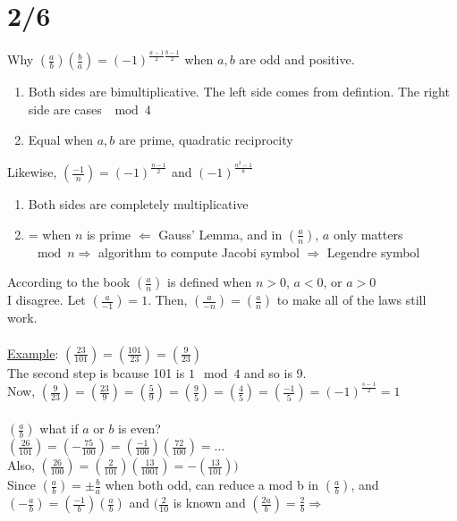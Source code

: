 \section*{2/6}
  Why $(\frac{a}{b})(\frac{b}{a}) = (-1)^{\frac{a-1}{2}\frac{b-1}{2}}$
  when $a,b$ are odd and positive.\\
  \begin{enumerate}
    \item Both sides are bimultiplicative. The left side comes from defintion.
      The right side are cases $\mod 4$
    \item Equal when $a,b$ are prime, quadratic reciprocity
  \end{enumerate}
  Likewise, $(\frac{-1}{n}) = (-1)^{\frac{n-1}{2}}$ and 
  $(-1)^{\frac{n^2-1}{8}}$\\
  \begin{enumerate}
    \item Both sides are completely multiplicative
    \item = when $n$ is prime $\Leftarrow$ Gauss' Lemma, and in $(\frac{a}{n})$,
    $a$ only matters $\mod n \Rightarrow$ algorithm to compute Jacobi symbol
    $\Rightarrow$ Legendre symbol
  \end{enumerate}
  According to the book $(\frac{a}{n})$ is defined when $n > 0$, $a < 0$, or
  $a > 0$\\
  I disagree. Let $(\frac{a}{-1}) = 1$. Then, $(\frac{a}{-n}) = (\frac{a}{n})$
  to make all of the laws still work.\\\\
  \underline{Example}: $(\frac{23}{101}) = (\frac{101}{23}) = (\frac{9}{23})$\\
  The second step is bcause 101 is $1 \mod 4$ and so is 9.\\
  Now, $(\frac{9}{23}) = (\frac{23}{9}) = (\frac{5}{9}) = (\frac{9}{5}) = 
  (\frac{4}{5}) = (\frac{-1}{5}) = (-1)^{\frac{s-1}{2}} = 1$\\\\
  $(\frac{a}{b})$ what if $a$ or $b$ is even?\\
  $(\frac{26}{101}) = (-\frac{75}{100}) = (\frac{-1}{100}) (\frac{72}{100}) =
    \ldots$\\
  Also, $(\frac{26}{100}) = (\frac{2}{101})(\frac{13}{1001}) = 
    -(\frac{13}{101}))$\\
  Since $(\frac{a}{b}) = \pm \frac{b}{a}$ when both odd, can reduce a mod b
  in $(\frac{a}{b})$, and $(-\frac{a}{b}) = (\frac{-1}{b})(\frac{a}{b})$ and
  $(\frac{2}{10}$ is known and $(\frac{2a}{b}) = \frac{2}{b} \Rightarrow$
